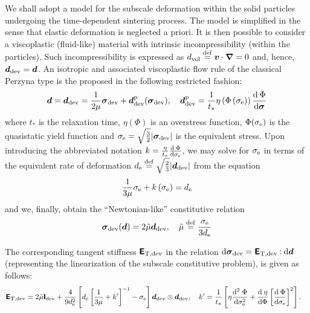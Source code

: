 \documentclass[10pt,a4paper]{article}
\newcommand{\tang}{\mathrm{T}}
\begin{document}
We shall adopt a model for the subscale deformation within the solid particles undergoing the time-dependent sintering process. The model is simplified in the sense that elastic deformation is neglected a priori. It is then possible to consider a viscoplastic (fluid-like) material with intrinsic incompressibility (within the particles). Such incompressibility is expressed as $d_{\mathrm{vol}}\overset{\mathrm{def}}{=}\boldsymbol{v}\cdot\boldsymbol{\nabla}=0$ and, hence, $\boldsymbol{d}_{\mathrm{dev}}=\boldsymbol{d}$. An isotropic and associated viscoplastic flow rule of the classical Perzyna type is the proposed in the following restricted fashion:
\begin{equation}
    \boldsymbol{d}=\boldsymbol{d}_{\mathrm{dev}} = \frac{1}{2\mu}\boldsymbol{\sigma}_{\mathrm{dev}} + \boldsymbol{d}_{\mathrm{dev}}^{\mathrm{p}}(\boldsymbol{\sigma}_{\mathrm{dev}}), \quad
    \boldsymbol{d}_{\mathrm{dev}}^{\mathrm{p}} = \frac{1}{t_*}\eta\left(\Phi\left(\sigma_{\mathrm{e}}\right)\right)\frac{\operatorname{d \!}\:\Phi}{\operatorname{d \!} \boldsymbol{\sigma}}
\label{eq201}
\end{equation}
where $t_*$ is the relaxation time, $\eta(\Phi)$ is an overstress function, $\Phi(\sigma_{\mathrm{e}})$ is the quasistatic yield function and $\sigma_{\mathrm{e}}=\sqrt{\frac{3}{2}}|\boldsymbol{\sigma}_{\mathrm{dev}}|$ is the equivalent stress. Upon introducing the abbreviated notation $k=\frac{\eta}{t_*}\frac{\operatorname{d \!}\:\Phi}{\operatorname{d \!} \sigma_{\mathrm{e}}}$, we may solve for $\sigma_{\mathrm{e}}$ in terms of the equivalent rate of deformation $d_{\mathrm{e}}\overset{\mathrm{def}}{=}\sqrt{\frac{2}{3}}|\boldsymbol{d}_{\mathrm{dev}}|$ from the equation
\begin{equation}
    \frac{1}{3\mu}\sigma_{\mathrm{e}} + k\left(\sigma_{\mathrm{e}}\right) = d_{\mathrm{e}}
\label{eq202}
\end{equation}
and we, finally, obtain the ``Newtonian-like'' constitutive relation
\begin{equation}
    \boldsymbol{\sigma}_{\mathrm{dev}}(\boldsymbol{d}) = 2\tilde{\mu}\boldsymbol{d}_{\mathrm{dev}}, \quad
    \tilde{\mu}\overset{\mathrm{def}}{=} \frac{\sigma_{\mathrm{e}}}{3d_{\mathrm{e}}}
\label{eq203}
\end{equation}

The corresponding tangent stiffness $\tf{E}_{\tang,\dev}$ in the relation $\dif\ts{\sigma}_\dev=\tf{E}_{\tang,\dev}\dprod\dif\ts{d}$ (representing the linearization of the subscale constitutive problem), is given as follows:
\begin{align}
 \tf E_{\tang,\dev} &= 2\tilde{\mu} \tf I_\dev + \frac{4}{9 d_\eqv^2} \left[ d_\eqv \left[ \frac{1}{3\mu} + k' \right]^{-1} - \sigma_\eqv \right] \ts d_\dev \outerp\ts d_\dev
 ,\quad k' = \frac{1}{t_*}\left[\eta \frac{\mathrm{d}^2\;\Phi}{\dif\sigma_\eqv^2} + \od{\eta}{\Phi}\left[\od{\Phi}{\sigma_\eqv}\right]^2\right].
\end{align}
\end{document}
